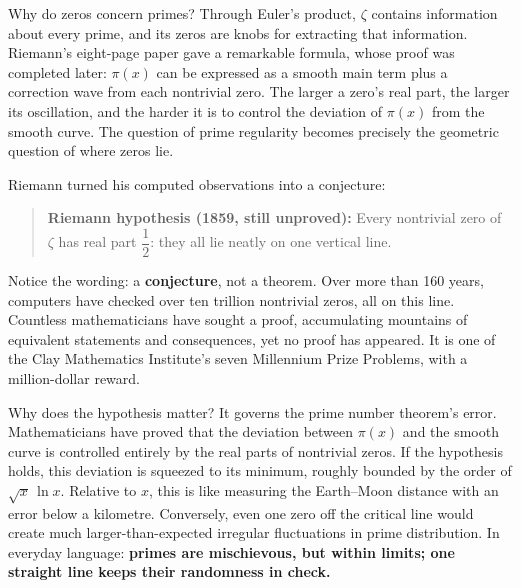 \begin{center}
\end{center}

Why do zeros concern primes? Through Euler's product, $\zeta$ contains information about every prime, and its zeros are knobs for extracting that information. Riemann's eight-page paper gave a remarkable formula, whose proof was completed later: $\pi(x)$ can be expressed as a smooth main term plus a correction wave from each nontrivial zero. The larger a zero's real part, the larger its oscillation, and the harder it is to control the deviation of $\pi(x)$ from the smooth curve. The question of prime regularity becomes precisely the geometric question of where zeros lie.

Riemann turned his computed observations into a conjecture:

\begin{quote}
\textbf{Riemann hypothesis (1859, still unproved):} Every nontrivial zero of $\zeta$ has real part $\dfrac12$: they all lie neatly on one vertical line.
\end{quote}

Notice the wording: a \textbf{conjecture}, not a theorem. Over more than 160 years, computers have checked over ten trillion nontrivial zeros, all on this line. Countless mathematicians have sought a proof, accumulating mountains of equivalent statements and consequences, yet no proof has appeared. It is one of the Clay Mathematics Institute's seven Millennium Prize Problems, with a million-dollar reward.

Why does the hypothesis matter? It governs the prime number theorem's error. Mathematicians have proved that the deviation between $\pi(x)$ and the smooth curve is controlled entirely by the real parts of nontrivial zeros. If the hypothesis holds, this deviation is squeezed to its minimum, roughly bounded by the order of $\sqrt{x}\,\ln x$. Relative to $x$, this is like measuring the Earth--Moon distance with an error below a kilometre. Conversely, even one zero off the critical line would create much larger-than-expected irregular fluctuations in prime distribution. In everyday language: \textbf{primes are mischievous, but within limits; one straight line keeps their randomness in check.}


